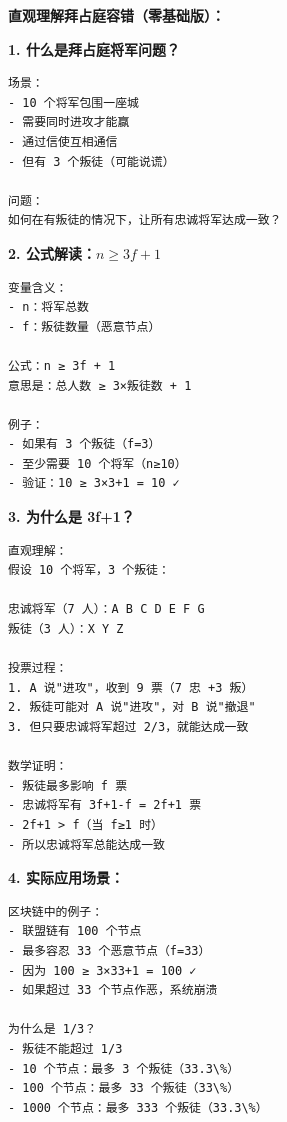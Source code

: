 \begin{theorybox}
\textbf{直观理解拜占庭容错（零基础版）：}

\textbf{1. 什么是拜占庭将军问题？}

\begin{lstlisting}
场景：
- 10 个将军包围一座城
- 需要同时进攻才能赢
- 通过信使互相通信
- 但有 3 个叛徒（可能说谎）

问题：
如何在有叛徒的情况下，让所有忠诚将军达成一致？
\end{lstlisting}

\textbf{2. 公式解读：$n \geq 3f + 1$}

\begin{lstlisting}
变量含义：
- n：将军总数
- f：叛徒数量（恶意节点）

公式：n ≥ 3f + 1
意思是：总人数 ≥ 3×叛徒数 + 1

例子：
- 如果有 3 个叛徒（f=3）
- 至少需要 10 个将军（n≥10）
- 验证：10 ≥ 3×3+1 = 10 ✓
\end{lstlisting}

\textbf{3. 为什么是 3f+1？}

\begin{lstlisting}
直观理解：
假设 10 个将军，3 个叛徒：

忠诚将军（7 人）：A B C D E F G
叛徒（3 人）：X Y Z

投票过程：
1. A 说"进攻"，收到 9 票（7 忠 +3 叛）
2. 叛徒可能对 A 说"进攻"，对 B 说"撤退"
3. 但只要忠诚将军超过 2/3，就能达成一致

数学证明：
- 叛徒最多影响 f 票
- 忠诚将军有 3f+1-f = 2f+1 票
- 2f+1 > f（当 f≥1 时）
- 所以忠诚将军总能达成一致
\end{lstlisting}

\textbf{4. 实际应用场景：}

\begin{lstlisting}
区块链中的例子：
- 联盟链有 100 个节点
- 最多容忍 33 个恶意节点（f=33）
- 因为 100 ≥ 3×33+1 = 100 ✓
- 如果超过 33 个节点作恶，系统崩溃

为什么是 1/3？
- 叛徒不能超过 1/3
- 10 个节点：最多 3 个叛徒（33.3\%）
- 100 个节点：最多 33 个叛徒（33\%）
- 1000 个节点：最多 333 个叛徒（33.3\%）
\end{lstlisting}
\end{theorybox}

